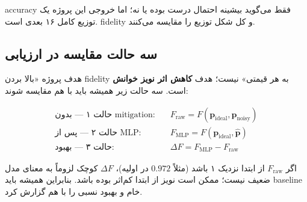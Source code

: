 accuracy فقط می‌گوید بیشینه احتمال درست بوده یا نه؛ اما خروجی این پروژه یک توزیع کامل ۱۶ بعدی است. fidelity و  کل شکل توزیع را مقایسه می‌کنند.

\subsection{سه حالت مقایسه در ارزیابی}

هدف پروژه «بالا بردن fidelity به هر قیمتی» نیست؛ هدف \textbf{کاهش اثر نویز خوانش} است. سه حالت زیر همیشه باید با هم مقایسه شوند:

\begin{align}
\text{حالت ۱ — بدون mitigation:}\quad
& F_{\mathrm{raw}} = F(\mathbf{p}_{\mathrm{ideal}}, \mathbf{p}_{\mathrm{noisy}})
\label{eq:f-raw}\\
\text{حالت ۲ — پس از MLP:}\quad
& F_{\mathrm{MLP}} = F(\mathbf{p}_{\mathrm{ideal}}, \hat{\mathbf{p}})
\label{eq:f-mlp}\\
\text{حالت ۳ — بهبود:}\quad
& \Delta F = F_{\mathrm{MLP}} - F_{\mathrm{raw}}
\label{eq:delta-f}
\end{align}

اگر $F_{\mathrm{raw}}$ از ابتدا نزدیک ۱ باشد (مثلاً $0.972$ در  اولیه)، $\Delta F$ کوچک لزوماً به معنای مدل ضعیف نیست؛ ممکن است نویز از ابتدا کم‌اثر بوده باشد. بنابراین همیشه باید baseline خام و بهبود نسبی را با هم گزارش کرد.

